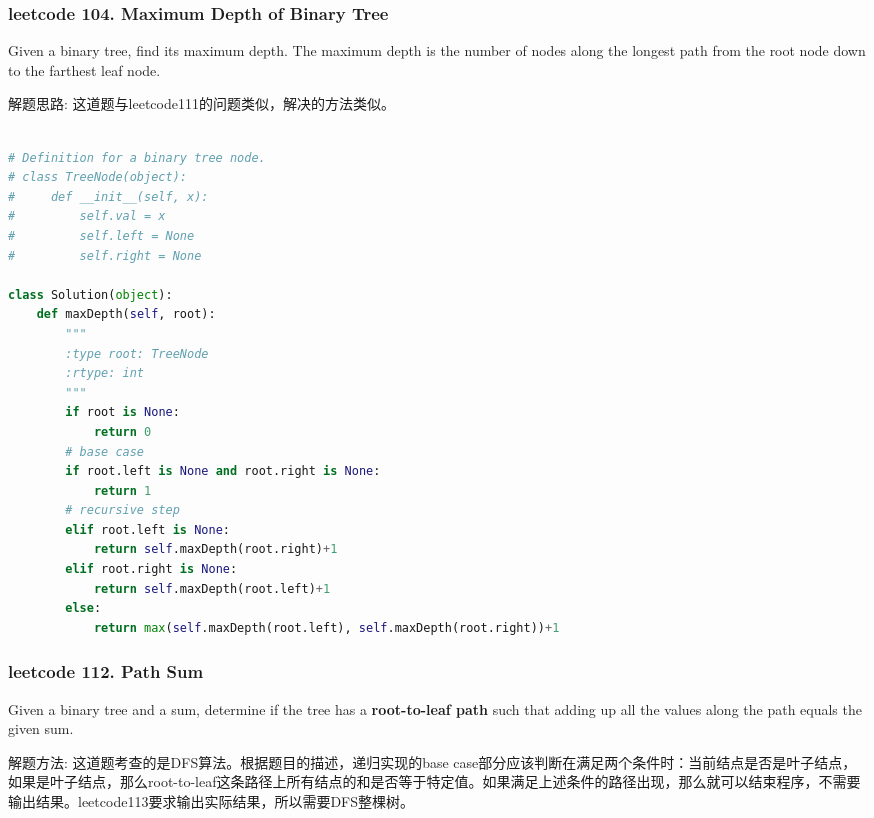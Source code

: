 \documentclass[a4paper,10pt]{article}
\begin{document}
\subsubsection{leetcode 104. Maximum Depth of Binary Tree}
Given a binary tree, find its maximum depth. The maximum depth is the number of nodes along the longest path from the root node down to the farthest leaf node. \\

\begin{CJK*}{UTF8}{gbsn}
\noindent 解题思路: 这道题与leetcode111的问题类似，解决的方法类似。
\end{CJK*}

\begin{lstlisting}[language=Python, caption=Problem104. Maximum Depth of Binary Tree]

# Definition for a binary tree node.
# class TreeNode(object):
#     def __init__(self, x):
#         self.val = x
#         self.left = None
#         self.right = None

class Solution(object):
    def maxDepth(self, root):
        """
        :type root: TreeNode
        :rtype: int
        """
        if root is None:
            return 0
        # base case
        if root.left is None and root.right is None:
            return 1
        # recursive step
        elif root.left is None:
            return self.maxDepth(root.right)+1
        elif root.right is None:
            return self.maxDepth(root.left)+1
        else:
            return max(self.maxDepth(root.left), self.maxDepth(root.right))+1
\end{lstlisting}


\subsubsection{leetcode 112. Path Sum}
Given a binary tree and a sum, determine if the tree has a \textbf{root-to-leaf path} such that adding up all the values along the path equals the given sum. \\

\begin{CJK*}{UTF8}{gbsn}
\noindent 解题方法: 这道题考查的是DFS算法。根据题目的描述，递归实现的base case部分应该判断在满足两个条件时：当前结点是否是叶子结点，如果是叶子结点，那么root-to-leaf这条路径上所有结点的和是否等于特定值。如果满足上述条件的路径出现，那么就可以结束程序，不需要输出结果。leetcode113要求输出实际结果，所以需要DFS整棵树。\\
\end{CJK*}
\end{document}

